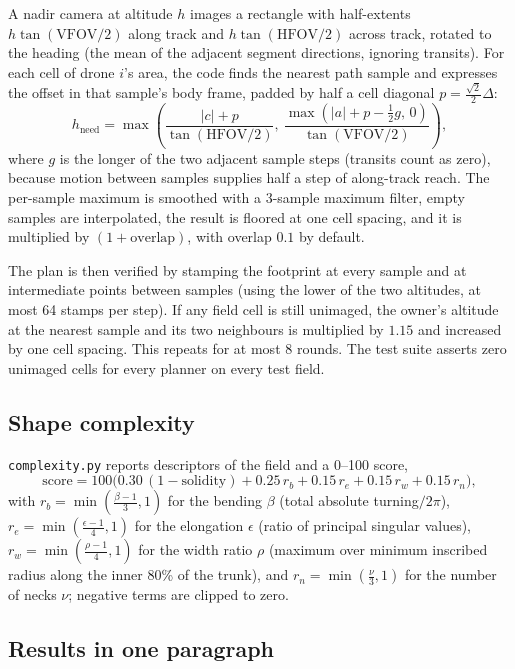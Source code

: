 \documentclass[11pt,a4paper]{article}
\newcommand{\code}[1]{\texttt{#1}}
\newcommand{\HFOV}{\mathrm{HFOV}}
\newcommand{\VFOV}{\mathrm{VFOV}}
\begin{document}
A nadir camera at altitude $h$ images a rectangle with half-extents $h\tan(\VFOV/2)$ along track and
$h\tan(\HFOV/2)$ across track, rotated to the heading (the mean of the adjacent segment directions,
ignoring transits). For each cell of drone $i$'s area, the code finds the nearest path sample and expresses
the offset in that sample's body frame, padded by half a cell diagonal $p = \tfrac{\sqrt2}{2}\Delta$:
\begin{equation}
h_{\text{need}} = \max\!\left(\frac{|c|+p}{\tan(\HFOV/2)},\ \frac{\max(|a|+p-\tfrac12 g,\,0)}{\tan(\VFOV/2)}\right),
\label{eq:hneed}
\end{equation}
where $g$ is the longer of the two adjacent sample steps (transits count as zero), because motion between
samples supplies half a step of along-track reach. The per-sample maximum is smoothed with a 3-sample
maximum filter, empty samples are interpolated, the result is floored at one cell spacing, and it is
multiplied by $(1+\text{overlap})$, with overlap $0.1$ by default.

The plan is then verified by stamping the footprint at every sample and at intermediate points between
samples (using the lower of the two altitudes, at most 64 stamps per step). If any field cell is still
unimaged, the owner's altitude at the nearest sample and its two neighbours is multiplied by $1.15$ and
increased by one cell spacing. This repeats for at most 8 rounds. The test suite asserts zero unimaged
cells for every planner on every test field.

\subsection{Shape complexity}

\code{complexity.py} reports descriptors of the field and a 0--100 score,
\begin{equation}
\text{score} = 100\bigl(0.30\,(1-\text{solidity}) + 0.25\,r_b + 0.15\,r_e + 0.15\,r_w + 0.15\,r_n\bigr),
\end{equation}
with $r_b=\min(\frac{\beta-1}{3},1)$ for the bending $\beta$ (total absolute turning$/2\pi$),
$r_e=\min(\frac{\epsilon-1}{4},1)$ for the elongation $\epsilon$ (ratio of principal singular values),
$r_w=\min(\frac{\rho-1}{4},1)$ for the width ratio $\rho$ (maximum over minimum inscribed radius along the
inner 80\% of the trunk), and $r_n=\min(\frac{\nu}{3},1)$ for the number of necks $\nu$; negative terms are
clipped to zero.

\subsection{Results in one paragraph}
\end{document}
